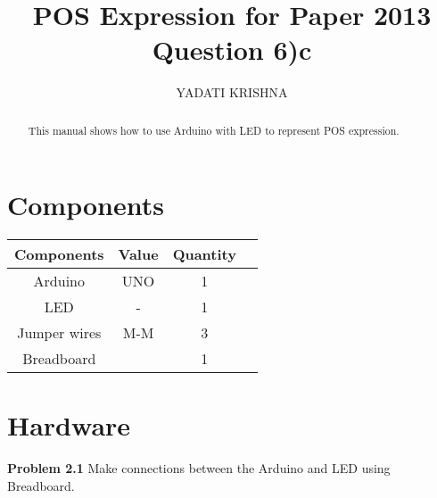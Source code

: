 \documentclass{article}
\title{POS Expression for Paper 2013 Question 6)c}
\author{YADATI KRISHNA}
\begin{document}
\maketitle
\begin{multicols}{2}
\tableofcontents
\vspace{10mm}

\begin{abstract}
 This manual shows how to use Arduino with LED to represent POS expression.
\end{abstract}
\section{Components}

    \centering
    \begin{tabular}{ |c |c |c |c |}
\hline
\textbf{Components} & \textbf{Value} & \textbf{Quantity} \\
\hline
 Arduino & UNO & 1 \\  
 LED & - & 1 \\
 Jumper wires&M-M &3\\
 Breadboard& &1\\
 \hline
 \end{tabular}
 \vspace{3mm}
 
    \label{table1}

\section{Hardware}

\textbf{Problem 2.1} Make connections between the Arduino and LED using Breadboard.


\end{multicols}
\end{document}

